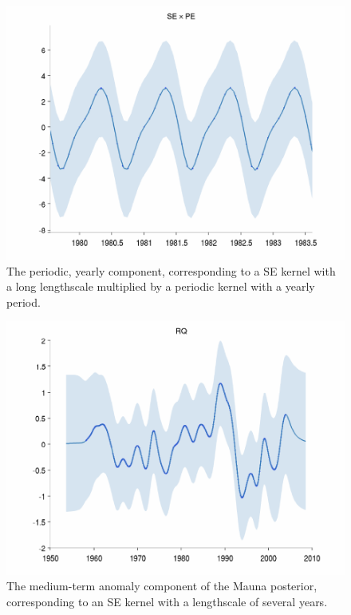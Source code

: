 \documentclass[twoside]{article}
\begin{document}
\begin{figure}
\includegraphics[width=\columnwidth]{../figures/decomposition/mauna_test_2_zoom}
\caption{The periodic, yearly component, corresponding to a SE kernel with a long lengthscale multiplied by a periodic kernel with a yearly period.}
\label{fig:mauna_decomp2}
\end{figure}

\begin{figure}
\includegraphics[width=\columnwidth]{../figures/decomposition/mauna_test_3}
\caption{The medium-term anomaly component of the Mauna posterior, corresponding to an SE kernel with a lengthscale of several years.}
\label{fig:mauna_decomp3}
\end{figure}
\end{document}
